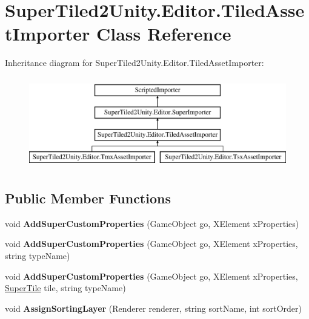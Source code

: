 \hypertarget{class_super_tiled2_unity_1_1_editor_1_1_tiled_asset_importer}{}\section{Super\+Tiled2\+Unity.\+Editor.\+Tiled\+Asset\+Importer Class Reference}
\label{class_super_tiled2_unity_1_1_editor_1_1_tiled_asset_importer}
Inheritance diagram for Super\+Tiled2\+Unity.\+Editor.\+Tiled\+Asset\+Importer\+:\begin{figure}[H]
\begin{center}
\leavevmode
\includegraphics[height=4.000000cm]{class_super_tiled2_unity_1_1_editor_1_1_tiled_asset_importer}
\end{center}
\end{figure}
\subsection*{Public Member Functions}
\begin{DoxyCompactItemize}
\item 
\mbox{\label{class_super_tiled2_unity_1_1_editor_1_1_tiled_asset_importer_a797f333549bb5292b6cdf6664b91ad46}} 
void {\bfseries Add\+Super\+Custom\+Properties} (Game\+Object go, X\+Element x\+Properties)
\item 
\mbox{\label{class_super_tiled2_unity_1_1_editor_1_1_tiled_asset_importer_a837bf8706c3d5d08eef6241b7ea45a90}} 
void {\bfseries Add\+Super\+Custom\+Properties} (Game\+Object go, X\+Element x\+Properties, string type\+Name)
\item 
\mbox{\label{class_super_tiled2_unity_1_1_editor_1_1_tiled_asset_importer_a37f97844e1b1ec00d4ec68aeef7de989}} 
void {\bfseries Add\+Super\+Custom\+Properties} (Game\+Object go, X\+Element x\+Properties, \mbox{\hyperlink{class_super_tiled2_unity_1_1_super_tile}{Super\+Tile}} tile, string type\+Name)
\item 
\mbox{\label{class_super_tiled2_unity_1_1_editor_1_1_tiled_asset_importer_a0e25004790e6379e90853ecbaa4768c4}} 
void {\bfseries Assign\+Sorting\+Layer} (Renderer renderer, string sort\+Name, int sort\+Order)
\end{DoxyCompactItemize}
